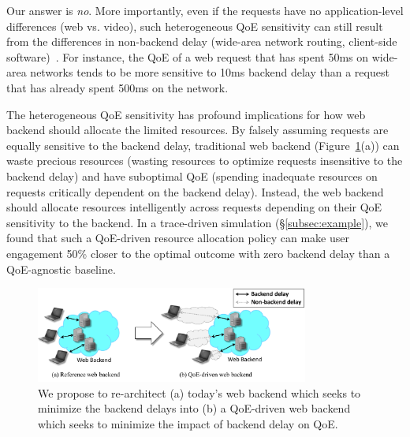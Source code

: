 Our answer is {\em no}.  More importantly, even if the requests have no application-level differences (\eg web vs. video), such heterogeneous QoE sensitivity can still result from the differences in non-backend delay (\eg wide-area network routing, client-side software)~\cite{timecard,dqbarge}.
For instance, the QoE of a web request that has spent 50ms on wide-area networks tends to be more sensitive to 10ms backend delay than a request that has already spent 500ms on the network. 

The heterogeneous QoE sensitivity has profound implications for how web backend should allocate the limited resources. 
By falsely assuming requests are equally sensitive to the backend delay, traditional web backend (Figure~\ref{fig:intro-overview}(a)) can waste precious resources (\eg wasting resources to optimize requests insensitive to the backend delay) and have suboptimal QoE (\eg spending inadequate resources on requests critically dependent on the backend delay). 
Instead, the web backend should allocate resources intelligently across requests depending on their QoE sensitivity to the backend. 
In a trace-driven simulation (\S\ref{subsec:example}), we found that such a QoE-driven resource allocation policy can make user engagement 50\% closer to the optimal outcome with zero backend delay than a QoE-agnostic baseline.

\begin{figure}[t]
	\centering
	\vspace{-0.5cm}
	\hspace{0.6cm}
	\includegraphics[width=0.8\textwidth]{figs/intro-overview.pdf}
	\vspace{-0.3cm}
	\caption{We propose to re-architect (a) today's web backend which seeks to minimize the backend delays into (b) a QoE-driven web backend which seeks to minimize the impact of backend delay on QoE.}
	\label{fig:intro-overview}
\end{figure}

